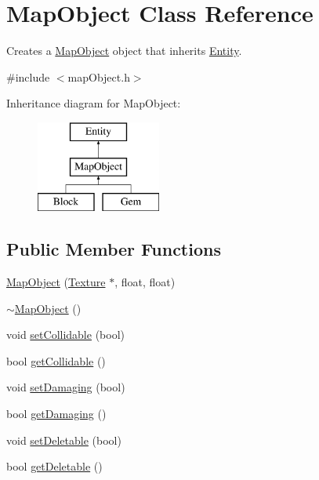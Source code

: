 \hypertarget{class_map_object}{\section{Map\+Object Class Reference}
\label{class_map_object}
}


Creates a \hyperlink{class_map_object}{Map\+Object} object that inherits \hyperlink{class_entity}{Entity}.  




{\ttfamily \#include $<$map\+Object.\+h$>$}

Inheritance diagram for Map\+Object\+:\begin{figure}[H]
\begin{center}
\leavevmode
\includegraphics[height=3.000000cm]{class_map_object}
\end{center}
\end{figure}
\subsection*{Public Member Functions}
\begin{DoxyCompactItemize}
\item 
\hyperlink{class_map_object_a1bd76f155f6f90b7d74a06f720bd3b3d}{Map\+Object} (\hyperlink{class_texture}{Texture} $\ast$, float, float)
\item 
\hyperlink{class_map_object_aa601344267a49df197e841fcbd732209}{$\sim$\+Map\+Object} ()
\item 
void \hyperlink{class_map_object_afc35a1271fdb83198e239a548b26337e}{set\+Collidable} (bool)
\item 
bool \hyperlink{class_map_object_a5c940048e408308c71b57a78444d155d}{get\+Collidable} ()
\item 
void \hyperlink{class_map_object_abcf8499f40944338e194abcbd3294852}{set\+Damaging} (bool)
\item 
bool \hyperlink{class_map_object_acaa0fff07bd2550c1f023ca90e2a4b04}{get\+Damaging} ()
\item 
void \hyperlink{class_map_object_af14721fd27162d9fd0f04f69d8087811}{set\+Deletable} (bool)
\item 
bool \hyperlink{class_map_object_a739bba3a3a50a84bf5e6244d19152a38}{get\+Deletable} ()
\end{DoxyCompactItemize}
